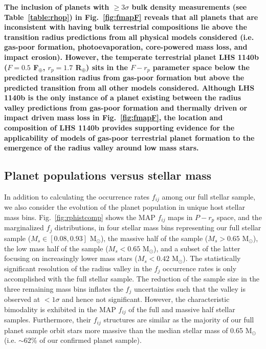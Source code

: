 \documentclass[twocolumn]{emulateapj}
\begin{document}
\textbf{The inclusion of planets with $\geq 3\sigma$ bulk density measurements (see Table~\ref{table:rhop}) in
  Fig.~\ref{fig:fmapF} reveals that all planets that are inconsistent with having bulk terrestrial
  compositions lie above the transition radius predictions from all physical models considered
  (i.e. gas-poor formation, photoevaporation, core-powered mass loss, and impact erosion). However, the
  temperate terrestrial planet LHS 1140b ($F=0.5$ F$_{\oplus}$, $r_p=1.7$ R$_{\oplus}$) sits in the $F-r_p$ parameter
  space below the predicted transition radius from gas-poor formation but above the predicted transition from all
  other models considered. Although LHS 1140b is the only instance of a planet
  existing between the radius valley predictions from gas-poor formation and thermally driven or impact driven
  mass loss in Fig.~\ref{fig:fmapF}, the location and composition of LHS 1140b
  provides supporting evidence for the applicability of models of 
  gas-poor terrestrial planet formation to the emergence of the radius valley around low mass stars.}

\subsection{Planet populations versus stellar mass} \label{sect:Msbin}
In addition to calculating the occurrence rates $f_{ij}$ among our full stellar sample, we also consider
the evolution of the planet population in unique host stellar mass bins. Fig.~\ref{fig:rphistcomp} shows
the MAP $f_{ij}$ maps in $P-r_p$ space, and the marginalized $f_j$ distributions, in four stellar mass bins
representing our full stellar sample
($M_s \in [0.08,0.93]$ M$_{\odot}$), the massive half of the sample ($M_s>0.65$ M$_{\odot}$),  
the low mass half of the sample ($M_s<0.65$ M$_{\odot}$), and a subset of the latter focusing on
increasingly lower mass stars ($M_s<0.42$ M$_{\odot}$). The statistically significant resolution of the
radius valley in the $f_j$ occurrence rates is only accomplished with the full stellar sample. The reduction
of the sample size in the three remaining mass bins inflates the $f_j$ uncertainties such that the valley
is observed at $<1\sigma$ and hence not significant. However, the characteristic bimodality is exhibited in the
MAP $f_{ij}$ of the full and massive half stellar samples. Furthermore, their $f_{ij}$ structures are similar
as the majority of our full planet sample orbit stars more massive than the median stellar mass of 0.65
M$_{\odot}$ (i.e. $\sim 62$\% of our confirmed planet sample).
\end{document}
